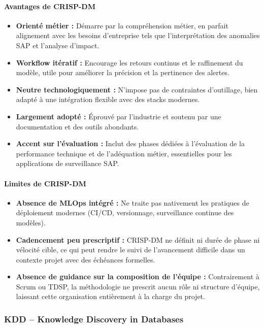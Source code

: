 \paragraph{Avantages de CRISP-DM}
\begin{itemize}[leftmargin=*, label=\textbullet]
  \item \textbf{Orienté métier :} Démarre par la compréhension métier, en parfait
        alignement avec les besoins d'entreprise tels que l'interprétation des anomalies
        SAP et l'analyse d'impact.
  \item \textbf{Workflow itératif :} Encourage les retours continus et le raffinement du
        modèle, utile pour améliorer la précision et la pertinence des alertes.
  \item \textbf{Neutre technologiquement :} N'impose pas de contraintes d'outillage, bien
        adapté à une intégration flexible avec des stacks modernes.
  \item \textbf{Largement adopté :} Éprouvé par l'industrie et soutenu par une
        documentation et des outils abondants.
  \item \textbf{Accent sur l'évaluation :} Inclut des phases dédiées à l'évaluation de
        la performance technique et de l'adéquation métier, essentielles pour les
        applications de surveillance SAP.
\end{itemize}

\paragraph{Limites de CRISP-DM}
\begin{itemize}[leftmargin=*, label=\textbullet]
  \item \textbf{Absence de MLOps intégré :} Ne traite pas nativement les pratiques de
        déploiement modernes (CI/CD, versionnage, surveillance continue des modèles).
  \item \textbf{Cadencement peu prescriptif :} CRISP-DM ne définit ni durée de phase ni
        vélocité cible, ce qui peut rendre le suivi de l'avancement difficile dans un
        contexte projet avec des échéances formelles.
  \item \textbf{Absence de guidance sur la composition de l'équipe :} Contrairement à
        Scrum ou TDSP, la méthodologie ne prescrit aucun rôle ni structure d'équipe,
        laissant cette organisation entièrement à la charge du projet.
\end{itemize}

\subsubsection{KDD – Knowledge Discovery in Databases}

